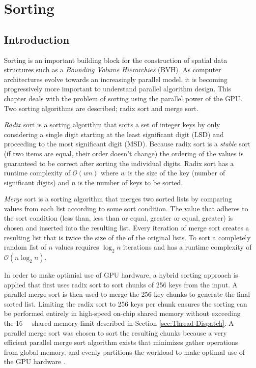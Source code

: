 
\chapter{Sorting} %
\label{ch:Sorting}

\section{Introduction}

Sorting is an important building block for the construction of spatial data structures such as a \emph{Bounding Volume Hierarchies} (BVH). As computer architectures evolve towards an increasingly parallel model, it is becoming progressively more important to understand parallel algorithm design. This chapter deals with the problem of sorting using the parallel power of the GPU. Two sorting algorithms are described; radix sort and merge sort.

\emph{Radix} sort is a sorting algorithm that sorts a set of integer keys by only considering a single digit starting at the least significant digit (LSD) and proceeding to the most significant digit (MSD). Because radix sort is a \emph{stable} sort (if two items are equal, their order doesn't change) the ordering of the values is guaranteed to be correct after sorting the individual digits. Radix sort has a runtime complexity of $\mathcal{O}(wn)$ where $w$ is the size of the key (number of significant digits) and $n$ is the number of keys to be sorted.

\emph{Merge} sort is a sorting algorithm that merges two sorted lists by comparing values from each list according to some sort condition. The value that adheres to the sort condition (less than, less than or equal, greater or equal, greater) is chosen and inserted into the resulting list. Every iteration of merge sort creates a resulting list that is twice the size of the of the original lists. To sort a completely random list of $n$ values requires $\log_2{n}$ iterations and has a runtime complexity of $\mathcal{O}(n\log_2{n})$. 

In order to make optimial use of GPU hardware, a hybrid sorting approach is applied that first uses radix sort to sort chunks of 256 keys from the input. A parallel merge sort is then used to merge the 256 key chunks to generate the final sorted list. Limiting the radix sort to 256 keys per chunk ensures the sorting can be performed entirely in high-speed on-chip shared memory without exceeding the \SI{16}{\kilo\byte} shared memory limit described in Section \ref{sec:Thread-Dispatch}. A parallel merge sort was chosen to sort the resulting chunks because a very efficient parallel merge sort algorithm exists that minimizes gather operations from global memory, and evenly partitions the workload to make optimal use of the GPU hardware \parencite{33_green_mccoll_bader_2012, 34_harris_sengupta_owens_2008}.

